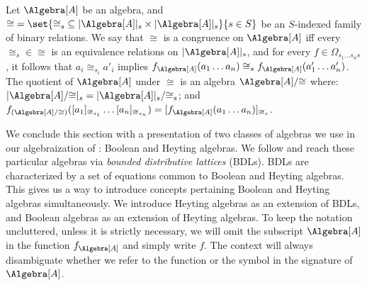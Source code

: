 \medskip
\begin{definition}
	Let $\Algebra[A]$ be an algebra, and ${\cong} = \set{{{\cong_s} \subseteq {|\Algebra[A]|_s \times |\Algebra[A]|_s}}}{s \in S}$ be an $S$-indexed family of binary relations.
	We say that $\cong$ is a congruence on $\Algebra[A]$ iff every ${\cong_{s}} \in {\cong}$ is an equivalence relations on $|\Algebra[A]|_{s}$, and for every $f \in \Omega_{s_1 \dots s_n s}$, it follows that
		$a_i \cong_{s_i} a'_i$
		implies
		$f_{\Algebra[A]}(a_1 \dots a_n) \cong_s f_{\Algebra[A]}(a_1' \dots a_n')$.
	The quotient of $\Algebra[A]$ under $\cong$ is an algebra $\Algebra[A]/{\cong}$ where:
		$|\Algebra[A]/{\cong}|_s = |\Algebra[A]|_s/{\cong_s}$;
		and
		$f_{(\Algebra[A]/{\cong})}([a_1]_{\cong_{s_1}} \dots [a_n]_{\cong_{s_n}}) = [f_{\Algebra[A]}(a_1 \dots a_n)]_{\cong_{s}}$.
\end{definition}
\medskip

We conclude this section with a presentation of two classes of algebras we use in our algebraization of \DAL: Boolean and Heyting algebras.
We follow \cite{Esakia:2019} and reach these particular algebras via \emph{bounded distributive lattices} (BDLs).
BDLs are characterized by a set of equations common to Boolean and Heyting algebras.
This gives us a way to introduce concepts pertaining Boolean and Heyting algebras simultaneously.
We introduce Heyting algebras as an extension of BDLs, and  Boolean algebras as an extension of Heyting algebras.
To keep the notation uncluttered, unless it is strictly necessary, we will omit the subscript $\Algebra[A]$ in the function $f_{\Algebra[A]}$ and simply write $f$. The context will always disambiguate whether we refer to the function or the symbol in the signature of $\Algebra[A]$.

